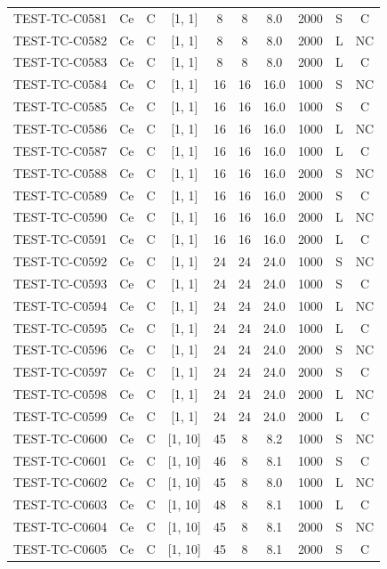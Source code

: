 \begin{longtable}{lccccccccc}
TEST-TC-C0581 & Ce & C & [1, 1] & 8 & 8 & 8.0 & 2000 & S & C \\
TEST-TC-C0582 & Ce & C & [1, 1] & 8 & 8 & 8.0 & 2000 & L & NC \\
TEST-TC-C0583 & Ce & C & [1, 1] & 8 & 8 & 8.0 & 2000 & L & C \\
TEST-TC-C0584 & Ce & C & [1, 1] & 16 & 16 & 16.0 & 1000 & S & NC \\
TEST-TC-C0585 & Ce & C & [1, 1] & 16 & 16 & 16.0 & 1000 & S & C \\
TEST-TC-C0586 & Ce & C & [1, 1] & 16 & 16 & 16.0 & 1000 & L & NC \\
TEST-TC-C0587 & Ce & C & [1, 1] & 16 & 16 & 16.0 & 1000 & L & C \\
TEST-TC-C0588 & Ce & C & [1, 1] & 16 & 16 & 16.0 & 2000 & S & NC \\
TEST-TC-C0589 & Ce & C & [1, 1] & 16 & 16 & 16.0 & 2000 & S & C \\
TEST-TC-C0590 & Ce & C & [1, 1] & 16 & 16 & 16.0 & 2000 & L & NC \\
TEST-TC-C0591 & Ce & C & [1, 1] & 16 & 16 & 16.0 & 2000 & L & C \\
TEST-TC-C0592 & Ce & C & [1, 1] & 24 & 24 & 24.0 & 1000 & S & NC \\
TEST-TC-C0593 & Ce & C & [1, 1] & 24 & 24 & 24.0 & 1000 & S & C \\
TEST-TC-C0594 & Ce & C & [1, 1] & 24 & 24 & 24.0 & 1000 & L & NC \\
TEST-TC-C0595 & Ce & C & [1, 1] & 24 & 24 & 24.0 & 1000 & L & C \\
TEST-TC-C0596 & Ce & C & [1, 1] & 24 & 24 & 24.0 & 2000 & S & NC \\
TEST-TC-C0597 & Ce & C & [1, 1] & 24 & 24 & 24.0 & 2000 & S & C \\
TEST-TC-C0598 & Ce & C & [1, 1] & 24 & 24 & 24.0 & 2000 & L & NC \\
TEST-TC-C0599 & Ce & C & [1, 1] & 24 & 24 & 24.0 & 2000 & L & C \\
TEST-TC-C0600 & Ce & C & [1, 10] & 45 & 8 & 8.2 & 1000 & S & NC \\
TEST-TC-C0601 & Ce & C & [1, 10] & 46 & 8 & 8.1 & 1000 & S & C \\
TEST-TC-C0602 & Ce & C & [1, 10] & 45 & 8 & 8.0 & 1000 & L & NC \\
TEST-TC-C0603 & Ce & C & [1, 10] & 48 & 8 & 8.1 & 1000 & L & C \\
TEST-TC-C0604 & Ce & C & [1, 10] & 45 & 8 & 8.1 & 2000 & S & NC \\
TEST-TC-C0605 & Ce & C & [1, 10] & 45 & 8 & 8.1 & 2000 & S & C \\

\end{longtable}
